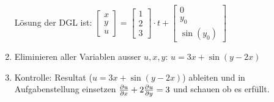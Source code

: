 \begin{enumerate}
	Lösung der DGL ist: $\begin{bmatrix}x\\y\\u\end{bmatrix}=\begin{bmatrix}1\\2\\3\end{bmatrix}\cdot t+ \begin{bmatrix}0\\y_0\\\sin(y_0)\end{bmatrix}$\\
	
	\item Eliminieren aller Variablen ausser $u,x,y$: $u=3x+\sin(y-2x)$
	\item Kontrolle:
	Resultat ($u=3x+\sin(y-2x)$) ableiten und in Aufgabenstellung einsetzen $\frac{\partial u}{\partial x}+2\frac{\partial u}{\partial y}=3$ und schauen ob es erfüllt.
	
\end{enumerate}
